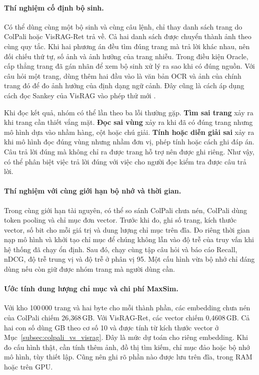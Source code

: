 \paragraph{Thí nghiệm cố định bộ sinh.}
Có thể dùng cùng một bộ sinh và cùng câu lệnh, chỉ thay danh sách trang
do ColPali hoặc VisRAG-Ret trả về. Cả hai danh sách được chuyển thành ảnh
theo cùng quy tắc. Khi hai phương án đều tìm đúng trang mà trả lời khác
nhau, nên đối chiếu thứ tự, số ảnh và ảnh hưởng của trang nhiễu. Trong
điều kiện Oracle, cấp thẳng trang đã gán nhãn để xem bộ sinh xử lý ra sao
khi có đúng nguồn. Với câu hỏi một trang, dùng thêm hai đầu vào là văn
bản OCR và ảnh của chính trang đó để đo ảnh hưởng của định dạng ngữ cảnh.
Đây cũng là cách áp dụng cách đọc Sankey của VisRAG vào phép thử mới
\cite{yu2025visrag}.

Khi đọc kết quả, nhóm có thể lần theo ba lỗi thường gặp. \textbf{Tìm sai
trang} xảy ra khi trang cần thiết vắng mặt. \textbf{Đọc sai vùng} xảy ra
khi đã có đúng trang nhưng mô hình dựa vào nhầm hàng, cột hoặc chú giải.
\textbf{Tính hoặc diễn giải sai} xảy ra khi mô hình đọc đúng vùng nhưng
nhầm đơn vị, phép tính hoặc cách ghi đáp án. Câu trả lời đúng mà không
chỉ ra được trang hỗ trợ nên được ghi riêng. Như vậy, có thể phân biệt
việc trả lời đúng với việc cho người đọc kiểm tra được câu trả lời.

\paragraph{Thí nghiệm với cùng giới hạn bộ nhớ và thời gian.}
Trong cùng giới hạn tài nguyên, có thể so sánh ColPali chưa nén,
ColPali dùng token pooling và chỉ mục đơn vector. Trước khi đo, ghi
số trang, kích thước vector, số bit cho mỗi giá trị và dung lượng chỉ
mục trên đĩa. Đo riêng thời gian nạp mô hình và khởi tạo chỉ mục để
chúng không lẫn vào độ trễ của truy vấn khi hệ thống đã chạy ổn định.
Sau đó, chạy cùng tập câu hỏi và báo cáo Recall, nDCG, độ trễ trung vị
và độ trễ ở phân vị 95. Một cấu hình vừa bộ nhớ chỉ đáng dùng nếu còn
giữ được nhóm trang mà người dùng cần.

\paragraph{Ước tính dung lượng chỉ mục và chi phí MaxSim.}
Với kho 100\,000 trang và hai byte cho mỗi thành phần, các embedding
chưa nén của ColPali chiếm 26,368\,GB. Với VisRAG-Ret, các vector chiếm
0,4608\,GB. Cả hai con số dùng GB theo cơ số 10 và được tính từ kích
thước vector ở Mục~\ref{subsec:colpali_vs_visrag}. Đây là mức dự toán cho
riêng embedding. Khi đo cấu hình thật, cần tính thêm ảnh, đồ thị tìm
kiếm, chỉ mục đảo hoặc bộ nhớ mô hình, tùy thiết lập. Cũng nên ghi rõ
phần nào được lưu trên đĩa, trong RAM hoặc trên GPU.

